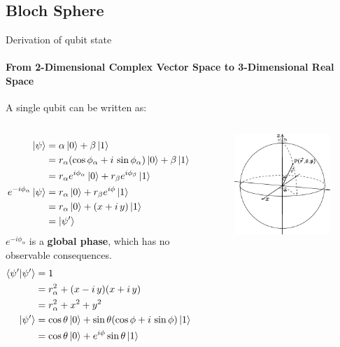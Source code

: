 \documentclass{beamer}
\begin{document}
\subsection{Bloch Sphere}
\begin{frame}{Derivation of qubit state\tiny\cite{blochsphere}}
  \framesubtitle{From 2-Dimensional Complex Vector Space to 3-Dimensional Real Space}
  {\tiny
  A single qubit can be written as:
  \begin{columns}
  \begin{align*}
    \ket{\psi} &= \alpha\ket{0}+\beta\ket{1} \\
               &= r_{\alpha}(\cos\phi_{\alpha} + i\,\sin\phi_{\alpha})\ket{0}+\beta\ket{1} \\
               &= r_{\alpha}e^{i\phi_{\alpha}}\ket{0} + r_{\beta}e^{i\phi_{\beta}}\ket{1}
    \\
    e^{-i\phi_{\alpha}}\ket{\psi} &= r_{\alpha}\ket{0} + r_{\beta}e^{i\phi}\ket{1} \\
                                  &= r_{\alpha}\ket{0} + (x+i\,y)\ket{1} \\
                                  &= \ket{\psi'}
  \end{align*}
  $e^{-i\phi_{\alpha}}$ is a \textbf{global phase}, which has no observable consequences.
  \begin{align*}
    \braket{\psi'|\psi'} &= 1 \\
                         &= r_{\alpha}^2 + (x-i\,y)(x+i\,y) \\
                         &= r_{\alpha}^2 + x^2 + y^2
    \\
    \ket{\psi'} &= \cos\theta\ket{0} + \sin\theta(\cos\phi + i\,\sin\phi)\ket{1} \\
                &= \cos\theta\ket{0}+e^{i\phi}\sin\theta\ket{1}
  \end{align*}
    \begin{figure}
      \includegraphics[scale=0.155]{figures/The-spherical-polar-coordinate-system}

\end{figure}
\end{columns}}
\end{frame}
\end{document}
